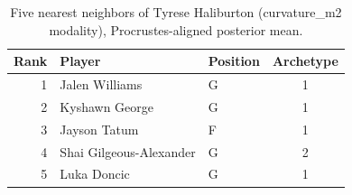 \begin{table}[htbp]
  \centering\small
  \begin{tabular}{rllc}
    \toprule
    Rank & Player & Position & Archetype \\
    \midrule
    1 & Jalen Williams & G & 1 \\
    2 & Kyshawn George & G & 1 \\
    3 & Jayson Tatum & F & 1 \\
    4 & Shai Gilgeous-Alexander & G & 2 \\
    5 & Luka Doncic & G & 1 \\
    \bottomrule
  \end{tabular}
  \caption{Five nearest neighbors of Tyrese Haliburton (curvature_m2 modality), Procrustes-aligned posterior mean.}
  \label{tab:Tyrese_Haliburton_neighbors_curvature_m2}
\end{table}

